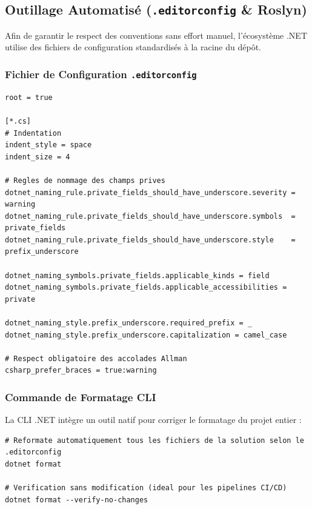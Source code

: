 \subsection{Outillage Automatisé (\texttt{.editorconfig} \& Roslyn)}

Afin de garantir le respect des conventions sans effort manuel, l'écosystème .NET utilise des fichiers de configuration standardisés à la racine du dépôt.

\subsubsection{Fichier de Configuration \texttt{.editorconfig}}

\begin{lstlisting}[caption={Exemple de fichier .editorconfig standard pour projet C\#}]
root = true

[*.cs]
# Indentation
indent_style = space
indent_size = 4

# Regles de nommage des champs prives
dotnet_naming_rule.private_fields_should_have_underscore.severity = warning
dotnet_naming_rule.private_fields_should_have_underscore.symbols  = private_fields
dotnet_naming_rule.private_fields_should_have_underscore.style    = prefix_underscore

dotnet_naming_symbols.private_fields.applicable_kinds = field
dotnet_naming_symbols.private_fields.applicable_accessibilities = private

dotnet_naming_style.prefix_underscore.required_prefix = _
dotnet_naming_style.prefix_underscore.capitalization = camel_case

# Respect obligatoire des accolades Allman
csharp_prefer_braces = true:warning
\end{lstlisting}

\subsubsection{Commande de Formatage CLI}

La CLI .NET intègre un outil natif pour corriger le formatage du projet entier :

\begin{lstlisting}[caption={Commandes dotnet format}]
# Reformate automatiquement tous les fichiers de la solution selon le .editorconfig
dotnet format

# Verification sans modification (ideal pour les pipelines CI/CD)
dotnet format --verify-no-changes
\end{lstlisting}



